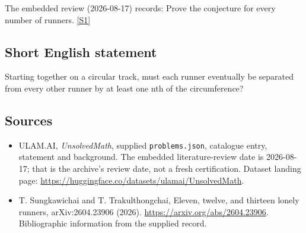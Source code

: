 \documentclass[11pt,a4paper]{article}
\newcommand{\sref}[2]{\hyperlink{source:#1:#2}{[S#2]}}
\begin{document}
The embedded review (2026-08-17) records: Prove the conjecture for every number of runners. \sref{statement}{1}

\subsection{Short English statement}

Starting together on a circular track, must each runner eventually be separated from every other runner by at least one nth of the circumference?

\subsection{Sources}

{\small

\begin{itemize}

\item[\hypertarget{source:statement:1}{S1}] ULAM.AI, \emph{UnsolvedMath}, supplied \texttt{problems.json}, catalogue entry, statement and background. The embedded literature-review date is 2026-08-17; that is the archive’s review date, not a fresh certification. Dataset landing page: \url{https://huggingface.co/datasets/ulamai/UnsolvedMath}.

\item[\hypertarget{source:statement:2}{S2}] T. Sungkawichai and T. Trakulthongchai, Eleven, twelve, and thirteen lonely runners, arXiv:2604.23906 (2026). \url{https://arxiv.org/abs/2604.23906}. Bibliographic information from the supplied record.

\end{itemize}

}

\label{end:statement}
\end{document}

